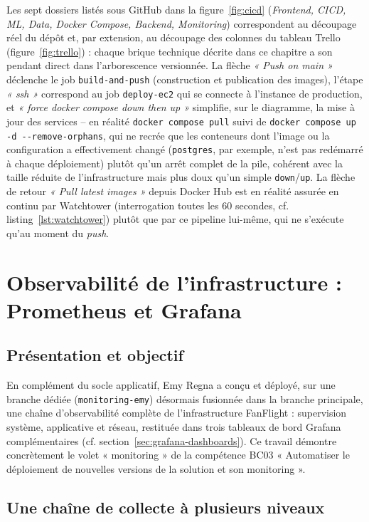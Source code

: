 \documentclass[11pt,a4paper]{report}
\newcommand{\code}[1]{\lstinline{#1}}
\begin{document}
Les sept dossiers listés sous GitHub dans la figure~\ref{fig:cicd} (\emph{Frontend, CICD, ML, Data, Docker Compose, Backend, Monitoring}) correspondent au découpage réel du dépôt et, par extension, au découpage des colonnes du tableau Trello (figure~\ref{fig:trello}) : chaque brique technique décrite dans ce chapitre a son pendant direct dans l'arborescence versionnée. La flèche \emph{« Push on main »} déclenche le job \code{build-and-push} (construction et publication des images), l'étape \emph{« ssh »} correspond au job \code{deploy-ec2} qui se connecte à l'instance de production, et \emph{« force docker compose down then up »} simplifie, sur le diagramme, la mise à jour des services -- en réalité \code{docker compose pull} suivi de \code{docker compose up -d --remove-orphans}, qui ne recrée que les conteneurs dont l'image ou la configuration a effectivement changé (\code{postgres}, par exemple, n'est pas redémarré à chaque déploiement) plutôt qu'un arrêt complet de la pile, cohérent avec la taille réduite de l'infrastructure mais plus doux qu'un simple \code{down}/\code{up}. La flèche de retour \emph{« Pull latest images »} depuis Docker Hub est en réalité assurée en continu par Watchtower (interrogation toutes les 60 secondes, cf. listing~\ref{lst:watchtower}) plutôt que par ce pipeline lui-même, qui ne s'exécute qu'au moment du \emph{push}.

\section{Observabilité de l'infrastructure : Prometheus et Grafana}
\label{sec:monitoring}

\subsection{Présentation et objectif}

En complément du socle applicatif, Emy Regna a conçu et déployé, sur une branche dédiée (\code{monitoring-emy}) désormais fusionnée dans la branche principale, une chaîne d'observabilité complète de l'infrastructure FanFlight : supervision système, applicative et réseau, restituée dans trois tableaux de bord Grafana complémentaires (cf. section~\ref{sec:grafana-dashboards}). Ce travail démontre concrètement le volet « monitoring » de la compétence BC03 « Automatiser le déploiement de nouvelles versions de la solution et son monitoring ».

\subsection{Une chaîne de collecte à plusieurs niveaux}
\end{document}
